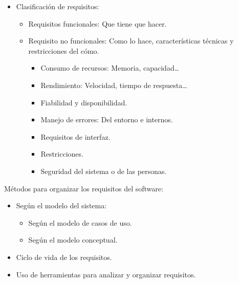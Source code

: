 \documentclass[12pt, twoside, openright]{report} %
\begin{document}
\begin{itemize}
\begin{itemize}
\begin{table}[h]
\begin{tabular}{|c|c|c|}
				\end{tabular}
				\end{table}
		\end{itemize}
  
    \item
      Clasificación de requisitos:

      \begin{itemize}
      
      \item
        Requisitos funcionales: Que tiene que hacer.
      \item
        Requisito no funcionales: Como lo hace, características
        técnicas y restricciones del cómo.

        \begin{itemize}
        
        \item
          Consumo de recursos: Memoria, capacidad\ldots{}
        \item
          Rendimiento: Velocidad, tiempo de respuesta\ldots{}
        \item
          Fiabilidad y disponibilidad.
        \item
          Manejo de errores: Del entorno e internos.
        \item
          Requisitos de interfaz.
		\item
		  Restricciones.
		\item
		  Seguridad del sistema o de las personas.
        \end{itemize}
      \end{itemize}
    \end{itemize}
\pagebreak
	Métodos para organizar los requisitos del software:

    \begin{itemize}
    
    \item
      Según el modelo del sistema:

      \begin{itemize}
      
      \item
        Según el modelo de casos de uso.
      \item
        Según el modelo conceptual.
      \end{itemize}
    \item
      Ciclo de vida de los requisitos.
    \item
      Uso de herramientas para analizar y organizar requisitos.
    \end{itemize}
\end{document}
